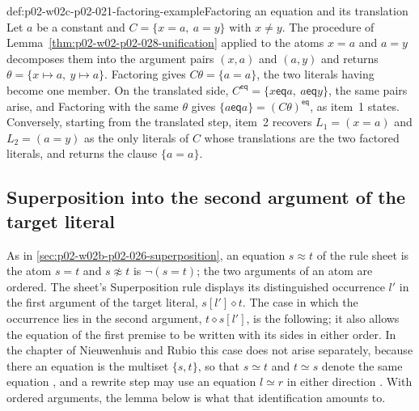\begin{hbexample}{def:p02-w02c-p02-021-factoring-example}{Factoring an equation and its translation}
Let \(a\) be a constant and \(C=\{x=a,\ a=y\}\) with \(x\neq y\).  The
procedure of Lemma~\ref{thm:p02-w02-p02-028-unification} applied to the atoms
\(x=a\) and \(a=y\) decomposes them into the argument pairs \((x,a)\) and
\((a,y)\) and returns \(\theta=\{x\mapsto a,\ y\mapsto a\}\).  Factoring
gives \(C\theta=\{a=a\}\), the two literals having become one member.  On the
translated side, \(C^{\mathsf{eq}}=\{x\mathrel{\mathsf{eq}}a,\
a\mathrel{\mathsf{eq}}y\}\), the same pairs arise, and Factoring with the same
\(\theta\) gives \(\{a\mathrel{\mathsf{eq}}a\}=(C\theta)^{\mathsf{eq}}\), as
item~1 states.  Conversely, starting from the translated step, item~2
recovers \(L_1=(x=a)\) and \(L_2=(a=y)\) as the only literals of \(C\) whose
translations are the two factored literals, and returns the clause
\(\{a=a\}\).
\end{hbexample}

\subsection{Superposition into the second argument of the target literal}
\label{sec:p02-w02c-p02-021-superposition}

As in \cref{sec:p02-w02b-p02-026-superposition}, an equation \(s\approx t\)
of the rule sheet is the atom \(s=t\) and \(s\not\approx t\) is
\(\neg(s=t)\); the two arguments of an atom are ordered.  The sheet's
Superposition rule displays its distinguished occurrence \(l'\) in the first
argument of the target literal, \(s[l']\mathrel{\diamond}t\).  The case in
which the occurrence lies in the second argument, \(t\mathrel{\diamond}s[l']\),
is the following; it also allows the equation of the first premise to be
written with its sides in either order.  In the chapter of Nieuwenhuis and
Rubio this case does not arise separately, because there an equation is the
multiset \(\{s,t\}\), so that \(s\simeq t\) and \(t\simeq s\) denote the same
equation \cite[\S2.1, p.~12]{NieuwenhuisRubio2001Typescript}, and a rewrite
step may use an equation \(l\simeq r\) in either direction
\cite[\S1.2, p.~5]{NieuwenhuisRubio2001Typescript}.  With ordered
arguments, the lemma below is what that identification amounts to.

